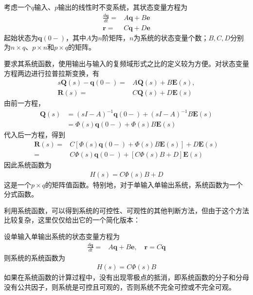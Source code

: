 考虑一个$q$输入、$p$输出的线性时不变系统，其状态变量方程为
\begin{align*}
    \frac{d\mathbf{q}}{dt}=&A\mathbf{q}+B\mathbf{e}\\
    \mathbf{r}=&C\mathbf{q}+D\mathbf{e}
\end{align*}
起始状态为$\mathbf{q}(0-)$，其中$A$为$n$阶矩阵，$n$为系统的状态变量个数；$B,C,D$分别为$n\times q$、$p\times n$和$p\times q$的矩阵。

要求其系统函数，使用输出与输入的复频域形式之比的定义较为方便。对状态变量方程两边进行拉普拉斯变换，有
\begin{align*}
    s\mathbf{Q}(s)-\mathbf{q}(0-)=&A\mathbf{Q}(s)+B\mathbf{E}(s),\\
    \mathbf{R}(s)=&C\mathbf{Q}(s)+D\mathbf{E}(s)
\end{align*}
由前一方程，
\begin{align*}
    \mathbf{Q}(s)&=(sI-A)^{-1}\mathbf{q}(0-)+(sI-A)^{-1}B\mathbf{E}(s)\\
    &=\Phi(s)\mathbf{q}(0-)+\Phi(s)B\mathbf{E}(s)
\end{align*}
代入后一方程，得到
\begin{align*}
    \mathbf{R}(s)=&C\left[\Phi(s)\mathbf{q}(0-)+\Phi(s)B\mathbf{E}(s)\right]+D\mathbf{E}(s)\\
    =&C\Phi(s)\mathbf{q}(0-)+\left[C\Phi(s)B+D\right]\mathbf{E}(s)
\end{align*}
因此系统函数为
\begin{align*}
    H(s)=C\Phi(s)B+D
\end{align*}
这是一个$p\times q$的矩阵值函数。特别地，对于单输入单输出系统，系统函数为一个分式函数。

利用系统函数，可以得到系统的可控性、可观性的其他判断方法，但由于这个方法比较复杂，这里仅仅给出它的一个简化版本：
\begin{claim}
    设单输入单输出系统的状态变量方程为
    \begin{align*}
        \frac{d\mathbf{q}}{dt}=&A\mathbf{q}+B \mathbf{e},\quad \mathbf{r}=C\mathbf{q}
    \end{align*}
    则系统的系统函数为
    \begin{align*}
        H(s)=C\Phi(s)B
    \end{align*}
    如果在系统函数的计算过程中，没有出现零极点的抵消，即系统函数的分子和分母没有公共因子，则系统是可控且可观的，否则系统不完全可控或不完全可观。
\end{claim}
